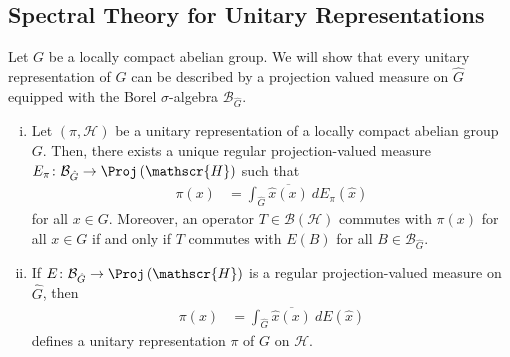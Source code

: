 \documentclass[10pt]{mypackage}
\begin{document}
\subsection{Spectral Theory for Unitary Representations}%
Let $G$ be a locally compact abelian group. We will show that every unitary representation of $G$ can be described by a projection valued measure on $ \hat{G} $ equipped with the Borel $\sigma$-algebra $\mathcal{B}_{\hat{G}}$.
\begin{theorem}\hfill
  \begin{enumerate}[(i)]
    \item Let $\left( \pi,\mathscr{H} \right)$ be a unitary representation of a locally compact abelian group $G$. Then, there exists a unique regular projection-valued measure $E_{\pi}\colon \mathcal{B}_{\hat{G}}\to \Proj\left( \mathscr{H} \right)$ such that
      \begin{align*}
        \pi(x) &= \int_{\hat{G}}^{} \overline{\hat{x}(x)}\:dE_{\pi}\left( \hat{x} \right)
      \end{align*}
      for all $x\in G$. Moreover, an operator $T\in \mathcal{B}\left( \mathscr{H} \right)$ commutes with $\pi(x)$ for all $x\in G$ if and only if $T$ commutes with $E(B)$ for all $B\in \mathcal{B}_{\hat{G}}$.
    \item If $E\colon \mathcal{B}_{\hat{G}}\to \Proj\left( \mathscr{H} \right)$ is a regular projection-valued measure on $\hat{G}$, then
      \begin{align*}
        \pi(x) &= \int_{\hat{G}}^{} \overline{\hat{x}(x)}\:dE\left( \hat{x} \right)
      \end{align*}
      defines a unitary representation $\pi$ of $G$ on $ \mathscr{H} $.
  \end{enumerate}
\end{theorem}
\end{document}
